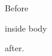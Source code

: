 \documentclass{article}
\begin{document}
Before \begin{undefinedenv}inside body\end{undefinedenv} after.
\end{document}
